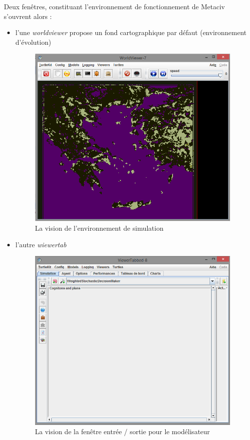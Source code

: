 \documentclass[a4paper,oneside,12 pt]{article}
\begin{document}
Deux fenêtres, constituant l'environnement de fonctionnement de Metaciv  s'ouvrent alors : 
\begin{itemize}
\item l'une \textit{worldviewer} propose un fond cartographique par défaut (environnement d'évolution)

\begin{figure}[hbtp]
\begin{center}
 \includegraphics [scale=0.5] {worldviewer.png}
\end{center}
 \caption{La vision de l'environnement de simulation}
\end{figure}
\newpage
\item l'autre \textit{wiewertab} 

\begin{figure}[hbtp]
\begin{center}
 \includegraphics [scale=0.5] {viewertabbed.png}
\end{center}
 \caption{La vision de la fenêtre entrée / sortie pour le modélisateur}
\end{figure}


\end{itemize}
\end{document}
